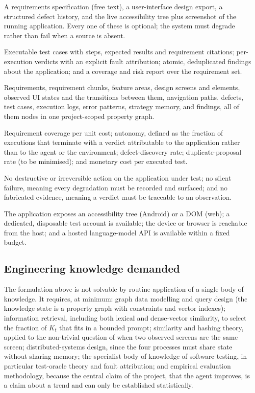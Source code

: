 \begin{description}[leftmargin=2.2em,style=nextline]
  \item[Inputs] A requirements specification (free text), a user-interface
    design export, a structured defect history, and the live accessibility tree
    plus screenshot of the running application. Every one of these is optional;
    the system must degrade rather than fail when a source is absent.
  \item[Outputs] Executable test cases with steps, expected results and
    requirement citations; per-execution verdicts with an explicit fault
    attribution; atomic, deduplicated findings about the application; and a
    coverage and risk report over the requirement set.
  \item[Entities] Requirements, requirement chunks, feature areas, design
    screens and elements, observed UI states and the transitions between them,
    navigation paths, defects, test cases, execution logs, error patterns,
    strategy memory, and findings, all of them nodes in one project-scoped property graph.
  \item[Quantities to be optimised] Requirement coverage per unit cost;
    autonomy, defined as the fraction of executions that terminate with a
    verdict attributable to the application rather than to the agent or the
    environment; defect-discovery rate; duplicate-proposal rate (to be
    minimised); and monetary cost per executed test.
  \item[Quantities to be guaranteed] No destructive or irreversible action on
    the application under test; no silent failure, meaning every degradation must be recorded and surfaced; and no fabricated evidence, meaning a verdict must be
    traceable to an observation.
  \item[Assumptions] The application exposes an accessibility tree (Android) or
    a DOM (web); a dedicated, disposable test account is available; the device
    or browser is reachable from the host; and a hosted language-model API is
    available within a fixed budget.
\end{description}

\subsection*{Engineering knowledge demanded}

The formulation above is not solvable by routine application of a single body
of knowledge. It requires, at minimum: graph data modelling and query design
(the knowledge state is a property graph with constraints and vector indexes);
information retrieval, including both lexical and dense-vector similarity, to
select the fraction of $K_t$ that fits in a bounded prompt; similarity and
hashing theory, applied to the non-trivial question of when two observed
screens are the same screen; distributed-systems design, since the four
processes must share state without sharing memory; the specialist body of
knowledge of software testing, in particular test-oracle theory and fault
attribution; and empirical evaluation methodology, because the central claim of
the project, that the agent improves, is a claim about a trend and can only be
established statistically.

